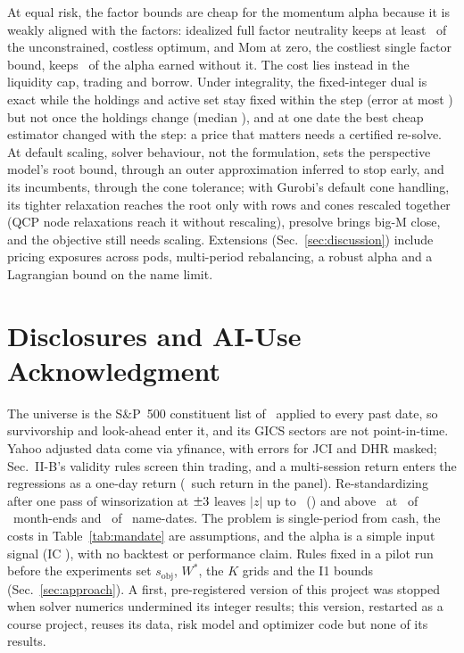 \documentclass[conference]{IEEEtran}
\begin{document}
At equal risk, the factor bounds are cheap for the momentum alpha because it is weakly aligned with the factors: idealized full factor neutrality keeps at least \IdealRetMomMin\ of the unconstrained, costless optimum, and Mom at zero, the costliest single factor bound, keeps \CTwoMomTight\ of the alpha earned without it. The cost lies instead in the liquidity cap, trading and borrow. Under integrality, the fixed-integer dual is exact while the holdings and active set stay fixed within the step (error at most \PredOneMax) but not once the holdings change (median \PredThreeMed), and at one date the best cheap estimator changed with the step: a price that matters needs a certified re-solve. At default scaling, solver behaviour, not the formulation, sets the perspective model's root bound, through an outer approximation inferred to stop early, and its incumbents, through the cone tolerance; with Gurobi's default cone handling, its tighter relaxation reaches the root only with rows and cones rescaled together (QCP node relaxations reach it without rescaling), presolve brings big-M close, and the objective still needs scaling. Extensions (Sec.~\ref{sec:discussion}) include pricing exposures across pods, multi-period rebalancing, a robust alpha and a Lagrangian bound on the name limit.

\section*{Disclosures and AI-Use Acknowledgment}
\label{sec:ai-use}

The universe is the S\&P~500 constituent list of \SnapshotDate\ applied to every past date, so survivorship and look-ahead enter it, and its GICS sectors are not point-in-time. Yahoo adjusted data come via yfinance, with errors for JCI and DHR masked; Sec.~II-B's validity rules screen thin trading, and a multi-session return enters the regressions as a one-day return (\MultiSessionReturns\ such return in the panel). Re-standardizing after one pass of winsorization at $\pm3$ leaves $|z|$ up to \DisclosureMaxZ\ (\DisclosureMaxZDate) and above \WinsorClip\ at \DisclosureDatesAbove\ of \DisclosureDates\ month-ends and \DisclosureNamesAbove\ of \DisclosureNames\ name-dates. The problem is single-period from cash, the costs in Table~\ref{tab:mandate} are assumptions, and the alpha is a simple input signal (IC \ICAssumed), with no backtest or performance claim. Rules fixed in a pilot run before the experiments set $s_{\mathrm{obj}}$, $W^*$, the $K$ grids and the I1 bounds (Sec.~\ref{sec:approach}). A first, pre-registered version of this project was stopped when solver numerics undermined its integer results; this version, restarted as a course project, reuses its data, risk model and optimizer code but none of its results.
\end{document}
